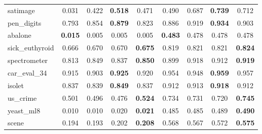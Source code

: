 \begin{figure}[ht]
\begin{tabular}{p{22mm}|*4{p{14mm}}|*4{p{14mm}}}
        satimage&\multicolumn{1}{c}{0.031}&\multicolumn{1}{c}{0.422}&\multicolumn{1}{c}{\textbf{0.518}}&\multicolumn{1}{c|}{0.471}&\multicolumn{1}{c}{0.490}&\multicolumn{1}{c}{0.687}&\multicolumn{1}{c}{\textbf{0.739}}&\multicolumn{1}{c}{0.712}\\
        pen\_digits&\multicolumn{1}{c}{0.793}&\multicolumn{1}{c}{0.854}&\multicolumn{1}{c}{\textbf{0.879}}&\multicolumn{1}{c|}{0.823}&\multicolumn{1}{c}{0.886}&\multicolumn{1}{c}{0.919}&\multicolumn{1}{c}{\textbf{0.934}}&\multicolumn{1}{c}{0.903}\\
        abalone&\multicolumn{1}{c}{\textbf{0.015}}&\multicolumn{1}{c}{0.005}&\multicolumn{1}{c}{0.005}&\multicolumn{1}{c|}{0.005}&\multicolumn{1}{c}{\textbf{0.483}}&\multicolumn{1}{c}{0.478}&\multicolumn{1}{c}{0.478}&\multicolumn{1}{c}{0.478}\\
        sick\_euthyroid&\multicolumn{1}{c}{0.666}&\multicolumn{1}{c}{0.670}&\multicolumn{1}{c}{0.670}&\multicolumn{1}{c|}{\textbf{0.675}}&\multicolumn{1}{c}{0.819}&\multicolumn{1}{c}{0.821}&\multicolumn{1}{c}{0.821}&\multicolumn{1}{c}{\textbf{0.824}}\\
        spectrometer&\multicolumn{1}{c}{0.813}&\multicolumn{1}{c}{0.849}&\multicolumn{1}{c}{0.837}&\multicolumn{1}{c|}{\textbf{0.850}}&\multicolumn{1}{c}{0.899}&\multicolumn{1}{c}{0.918}&\multicolumn{1}{c}{0.912}&\multicolumn{1}{c}{\textbf{0.919}}\\
        car\_eval\_34&\multicolumn{1}{c}{0.915}&\multicolumn{1}{c}{0.903}&\multicolumn{1}{c}{\textbf{0.925}}&\multicolumn{1}{c|}{0.920}&\multicolumn{1}{c}{0.954}&\multicolumn{1}{c}{0.948}&\multicolumn{1}{c}{\textbf{0.959}}&\multicolumn{1}{c}{0.957}\\
        isolet&\multicolumn{1}{c}{0.837}&\multicolumn{1}{c}{0.839}&\multicolumn{1}{c}{\textbf{0.849}}&\multicolumn{1}{c|}{0.837}&\multicolumn{1}{c}{0.912}&\multicolumn{1}{c}{0.913}&\multicolumn{1}{c}{\textbf{0.918}}&\multicolumn{1}{c}{0.912}\\
        us\_crime&\multicolumn{1}{c}{0.501}&\multicolumn{1}{c}{0.496}&\multicolumn{1}{c}{0.476}&\multicolumn{1}{c|}{\textbf{0.524}}&\multicolumn{1}{c}{0.734}&\multicolumn{1}{c}{0.731}&\multicolumn{1}{c}{0.720}&\multicolumn{1}{c}{\textbf{0.745}}\\
        yeast\_ml8&\multicolumn{1}{c}{0.010}&\multicolumn{1}{c}{0.010}&\multicolumn{1}{c}{0.020}&\multicolumn{1}{c|}{\textbf{0.021}}&\multicolumn{1}{c}{0.485}&\multicolumn{1}{c}{0.485}&\multicolumn{1}{c}{0.489}&\multicolumn{1}{c}{\textbf{0.490}}\\
        scene&\multicolumn{1}{c}{0.194}&\multicolumn{1}{c}{0.193}&\multicolumn{1}{c}{0.202}&\multicolumn{1}{c|}{\textbf{0.208}}&\multicolumn{1}{c}{0.568}&\multicolumn{1}{c}{0.567}&\multicolumn{1}{c}{0.572}&\multicolumn{1}{c}{\textbf{0.575}}\\

\end{tabular}
\end{figure}
